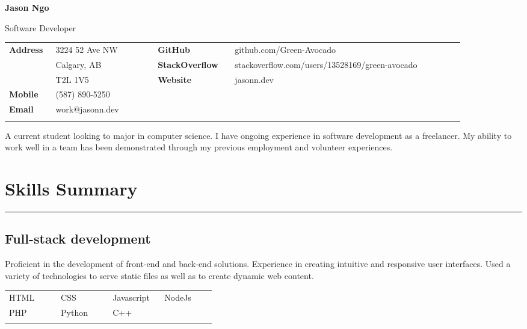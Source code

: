 \documentclass[letterpaper]{article}
\newcommand{\horizontalLine}{%
    \rule{\linewidth}{0.2pt}
    \vspace{1ex}
}
\begin{document}
    {\Huge
    \textbf{Jason Ngo}}

    {\large
    Software Developer}

    {\small%
        \renewcommand{\arraystretch}{1.5}
        \begin{tabular}{p{0.08\linewidth} p{0.2\linewidth} p{0.15\linewidth} p{0.45\linewidth}}
            \\
            \textbf{Address} & 3224 52 Ave NW & \textbf{GitHub} & github.com/Green-Avocado \\
            & Calgary, AB & \textbf{StackOverflow} & stackoverflow.com/users/13528169/green-avocado \\
            & T2L 1V5 & \textbf{Website} & jasonn.dev \\
            \textbf{Mobile} & (587) 890-5250 \\
            \textbf{Email} & work@jasonn.dev \\
            \\
        \end{tabular}
    }

    A current student looking to major in computer science.
    I have ongoing experience in software development as a freelancer.
    My ability to work well in a team has been demonstrated through my previous employment and volunteer experiences.

    \section*{Skills Summary}

        \horizontalLine

        \subsection*{Full-stack development}

        Proficient in the development of front-end and back-end solutions.
        Experience in creating intuitive and responsive user interfaces.
        Used a variety of technologies to serve static files as well as to create dynamic web content.

        \begin{center}
        \begin{tabular}{p{0.22\linewidth} p{0.22\linewidth} p{0.22\linewidth} p{0.22\linewidth}}
            \\
            HTML & CSS & Javascript & NodeJs \\
            PHP & Python & C++ &\\
            \\
        \end{tabular}
        \end{center}
\end{document}
